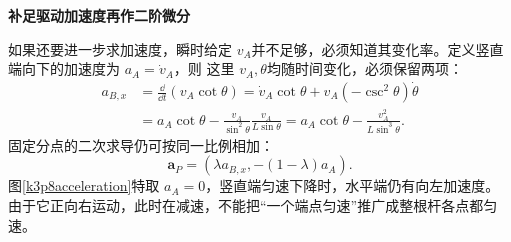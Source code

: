 \begin{solution}



\par\medskip{}\noindent\textbf{补足驱动加速度再作二阶微分}\par\nobreak
如果还要进一步求加速度，瞬时给定 $v_A$并不足够，必须知道其变化率。定义竖直端向下的加速度为 $a_A=\dot v_A$，则
这里 $v_A,\theta$均随时间变化，必须保留两项：
\begin{align*}
 a_{B,x}&=\frac{\dd}{\dd t}(v_A\cot\theta)
 =\dot v_A\cot\theta+v_A(-\csc^2\theta)\dot\theta\\
 &=a_A\cot\theta-\frac{v_A}{\sin^2\theta}
 \frac{v_A}{L\sin\theta}
 =a_A\cot\theta-\frac{v_A^2}{L\sin^3\theta}.
\end{align*}
固定分点的二次求导仍可按同一比例相加：
\[\bm a_P=\left(\lambda a_{B,x},-(1-\lambda)a_A\right).\]
图\ref{k3p8acceleration}特取 $a_A=0$，竖直端匀速下降时，水平端仍有向左加速度。由于它正向右运动，此时在减速，不能把“一个端点匀速”推广成整根杆各点都匀速。
\end{solution}
